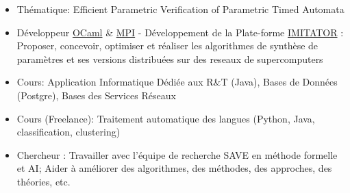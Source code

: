 \documentclass[10pt,a4paper,ragged2e]{altacv}
\begin{document}
	\divider
	
	\begin{itemize}
		\item Thématique: Efficient Parametric Verification of Parametric Timed Automata
		\item Développeur \href{https://ocaml.org/}{OCaml} \& \href{https://computing.llnl.gov/tutorials/mpi/}{MPI} - Développement de la Plate-forme \href{https://www.imitator.fr/}{IMITATOR} : 
		Proposer, concevoir, optimiser et réaliser les algorithmes  de synthèse de paramètres et ses versions distribuées sur des reseaux de supercomputers
	\end{itemize}
	
	\divider
	
	\begin{itemize}
		\item Cours: Application Informatique Dédiée aux R\&T (Java), Bases de Données (Postgre), Bases des Services Réseaux
		\item Cours (Freelance): Traitement automatique des langues (Python, Java, classification, clustering)
	\end{itemize}
	
	\divider
	
%	
	
	\begin{itemize}
		\item Chercheur : Travailler avec l'équipe de recherche SAVE en méthode formelle et AI; Aider à améliorer des algorithmes, des méthodes, des approches, des théories, etc. 
	\end{itemize}
	
\end{document}
